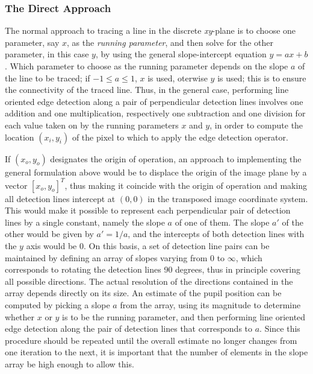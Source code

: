 \subsubsection{The Direct Approach}

The normal approach to tracing a line in the discrete {\em xy\/}-plane
is to choose one parameter, say $x$, as the {\em running parameter\/},
and then solve for the other parameter, in this case $y$, by using the
general slope-intercept equation $y=ax+b$.  Which parameter to choose
as the running parameter depends on the slope $a$ of the line to be
traced; if $-1\leq a\leq 1$, $x$ is used, oterwise $y$ is used; this
is to ensure the connectivity of the traced line.  Thus, in the
general case, performing line oriented edge detection along a pair of
perpendicular detection lines involves one addition and one
multiplication, respectively one subtraction and one division for each
value taken on by the running parameters $x$ and $y$, in order to
compute the location $(x_{i},y_{i})$ of the pixel to which to apply
the edge detection operator.

If $(x_{o},y_{o})$ designates the origin of operation, an approach to
implementing the general formulation above would be to displace the
origin of the image plane by a vector $[x_{o},y_{o}]^{T}$, thus making
it coincide with the origin of operation and making all detection
lines intercept at $(0,0)$ in the transposed image coordinate system.
This would make it possible to represent each perpendicular pair of
detection lines by a single constant, namely the slope $a$ of one of
them.  The slope $a'$ of the other would be given by $a'=1/a$, and the
intercepts of both detection lines with the $y$ axis would be 0.  On
this basis, a set of detection line pairs can be maintained by
defining an array of slopes varying from 0 to $\infty$, which
corresponds to rotating the detection lines 90 degrees, thus in
principle covering all possible directions.  The actual resolution of
the directions contained in the array depends directly on its size.
An estimate of the pupil position can be computed by picking a slope
$a$ from the array, using its magnitude to determine whether $x$ or
$y$ is to be the running parameter, and then performing line oriented
edge detection along the pair of detection lines that corresponds to
$a$.  Since this procedure should be repeated until the overall
estimate no longer changes from one iteration to the next, it is
important that the number of elements in the slope array be high
enough to allow this.

